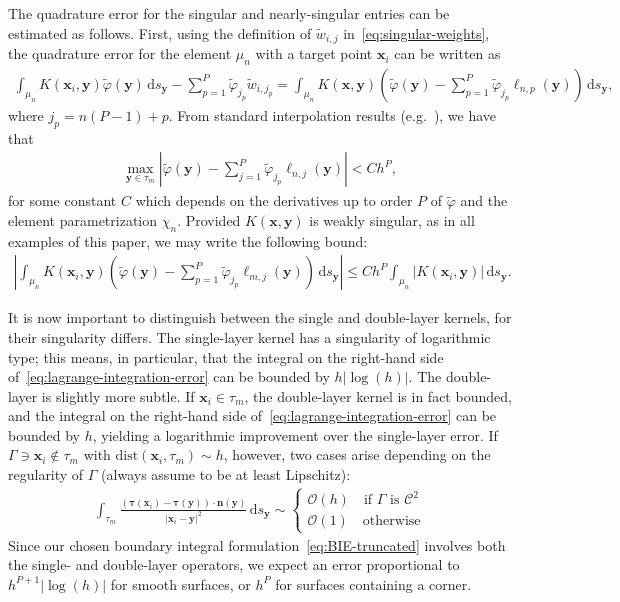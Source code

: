 \documentclass[review,hidelinks,onefignum,onetabnum]{siamart220329}
\newcommand{\bn}{\mathbf{n}}
\newcommand{\bx}{\mathbf{x}}
\newcommand{\btau}{\boldsymbol{\tau}}
\newcommand{\by}{\mathbf{y}}
\newcommand{\de}{\,\mathrm{d}}
\newcommand{\tvarphi}{\widetilde \varphi}
\begin{document}
The quadrature error for the singular and nearly-singular entries can be estimated as follows. First, using the definition of $\widetilde{w}_{i,j}$ in~\cref{eq:singular-weights}, the quadrature error for the element $\mu_n$ with a target point $\bx_i$ can be written as
\begin{align}
    \label{eq:singular-quadrature-split}
    \int_{\mu_n} K(\bx_i,\by) \tvarphi(\by) \de s_{\by} - \sum_{p=1}^P \tvarphi_{j_p} \widetilde{w}_{i,j_p} =
    \int_{\mu_n} K(\bx,\by) \left( \tvarphi(\by) - \sum_{p=1}^P \tvarphi_{j_p} \ell_{n,p}(\by) \right) \de s_{\by},
\end{align}
where $j_{p} = n(P-1)+p$.  From standard interpolation results (e.g.~\cite[Theorem 1]{strang1972approximation}), we have that 
\begin{align}
    \max_{\by \in \tau_m} \left|  \tvarphi(\by) - \sum_{j=1}^P \tvarphi_{j_p} \ell_{n,j}(\by)  \right| < C h^P,
\end{align}
for some constant $C$ which depends on the derivatives up to order $P$ of $\tvarphi$ and the element parametrization $\chi_n$. 
Provided $K(\bx,\by)$ is weakly singular, as in all examples of this paper, we may write the following bound:
\begin{align}
    \label{eq:lagrange-integration-error}
    \left| \int_{\mu_n} K(\bx_i,\by) \left( \tvarphi(\by) - \sum_{p=1}^P \tvarphi_{j_p} \ell_{m,j}(\by) \right) \de s_{\by} \right| \leq C h^{P} \int_{\mu_n} | K(\bx_i,\by) | \de s_{\by}.
\end{align}

It is now important to distinguish between the single and double-layer kernels, for
their singularity differs. The single-layer kernel has a singularity of
logarithmic type; this means, in particular,
that the integral on the right-hand side of~\cref{eq:lagrange-integration-error}
can be bounded by $h |\log(h)|$. The double-layer is slightly more subtle. If
$\bx_i \in \tau_m$, the double-layer kernel is in fact bounded, and the integral on the right-hand side of~\cref{eq:lagrange-integration-error}
can be bounded by $h$, yielding a logarithmic improvement over the single-layer
error. If $\Gamma \ni \bx_i \not \in \tau_m$ with $\mbox{dist}(\bx_i,\tau_m) \sim h$, however, two cases arise depending on the regularity of $\Gamma$ (always assume to be at least Lipschitz):
\begin{align}
  \int_{\tau_m} \frac{(\btau(\bx_i) - \btau(\by))\cdot \bn(\by)}{|\bx_i - \by|^2}  \de s_{\by} \sim 
  \begin{cases}
    \mathcal{O}(h) \quad \mbox{if $\Gamma$ is $\mathcal{C}^2$}\\
    \mathcal{O}(1) \quad \mbox{otherwise}
  \end{cases}
\end{align}
Since our chosen boundary integral formulation~\cref{eq:BIE-truncated} involves both the single- and
double-layer operators, we expect an error proportional to $h^{P+1} |\log(h)|$ for smooth surfaces, or $h^P$ for surfaces containing a corner. 
\end{document}
